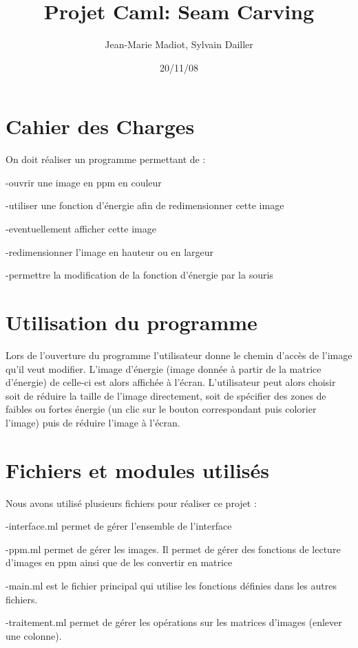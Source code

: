 \documentclass{article}
\title{Projet Caml: Seam Carving}
\author{Jean-Marie Madiot, Sylvain Dailler}
\date{20/11/08}
\begin{document}
\maketitle{}

\section{Cahier des Charges}

On doit réaliser un programme permettant de :
\item{-ouvrir une image en ppm en couleur}
\item{-utiliser une fonction d'énergie afin de redimensionner cette image}
\item{-eventuellement afficher cette image}
\item{-redimensionner l'image en hauteur ou en largeur}
\item{-permettre la modification de la fonction d'énergie par la souris}


\section{Utilisation du programme}

Lors de l'ouverture du programme l'utilisateur donne le chemin d'accès de l'image qu'il veut modifier. L'image d'énergie (image donnée à partir de la matrice d'énergie) de celle-ci est alors affichée à l'écran. L'utilisateur peut alors choisir soit de réduire la taille de l'image directement, soit de spécifier des zones de faibles ou fortes énergie (un clic sur le bouton correspondant puis colorier l'image) puis de réduire l'image à l'écran.

\section{Fichiers et modules utilisés}

Nous avons utilisé plusieurs fichiers pour réaliser ce projet : 
\item{-interface.ml permet de gérer l'ensemble de l'interface} 
\item{-ppm.ml permet de gérer les images. Il permet de gérer des fonctions de lecture d'images en ppm ainsi que de les  convertir en matrice}
\item{-main.ml est le fichier principal qui utilise les fonctions définies dans les autres fichiers.}
\item{-traitement.ml permet de gérer les opérations sur les matrices d'images (enlever une colonne).} 
\end{document}
